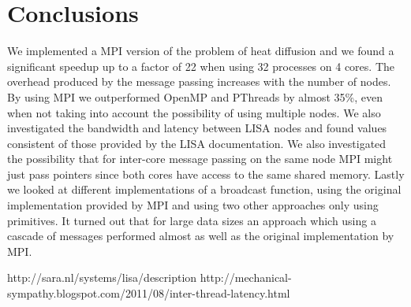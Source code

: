 \documentclass[11pt,a4paper,onecolumn]{article}
\begin{document}
\section{Conclusions}
We implemented a MPI version of the problem of heat diffusion and we found a significant speedup up to a factor of 22 when using 32 processes on 4 cores. The overhead produced by the message passing increases with the number of nodes. By using MPI we outperformed OpenMP and PThreads by almost 35\%, even when not taking into account the possibility of using multiple nodes. We also investigated the bandwidth and latency between LISA nodes and found values consistent of those provided by the LISA documentation. We also investigated the possibility that for inter-core message passing on the same node MPI might just pass pointers since both cores have access to the same shared memory. Lastly we looked at different implementations of a broadcast function, using the original implementation provided by MPI and using two other approaches only using primitives. It turned out that for large data sizes an approach which using a cascade of messages performed almost as well as the original implementation by MPI.

\begin{thebibliography}{7}
  http://sara.nl/systems/lisa/description
  http://mechanical-sympathy.blogspot.com/2011/08/inter-thread-latency.html
\end{thebibliography}
\end{document}
